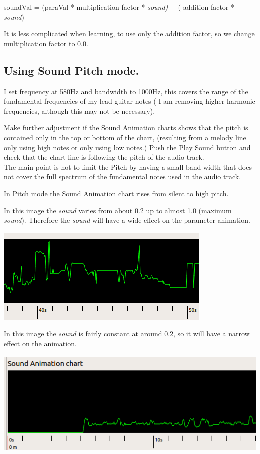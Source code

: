 soundVal = (paraVal * multiplication-factor * \emph{sound)} + (
addition-factor * \emph{sound})

It is less complicated when learning, to use only the addition factor,
so we change multiplication factor to 0.0.

\subsection{Using Sound Pitch mode.}\label{using-sound-pitch-mode.}

I set frequency at 580Hz and bandwidth to 1000Hz, this covers the range
of the fundamental frequencies of my lead guitar notes ( I am removing
higher harmonic frequencies, although this may not be necessary).

Make further adjustment if the Sound Animation charts shows that the
pitch is contained only in the top or bottom of the chart, (resulting
from a melody line only using high notes or only using low notes.) Push
the Play Sound button and check that the chart line is following the
pitch of the audio track.\\
The main point is not to limit the Pitch by having a small band width
that does not cover the full spectrum of the fundamental notes used in
the audio track.

In Pitch mode the Sound Animation chart rises from silent to high pitch.

In this image the \emph{sound} varies from about 0.2 up to almost 1.0
(maximum \emph{sound}). Therefore the \emph{sound} will have a wide
effect on the parameter animation.

\includegraphics[width=4.07283in,height=1.81260in]{img/sound/media/image5.png}

In this image the \emph{sound} is fairly constant at around 0.2, so it
will have a narrow effect on the animation.

\includegraphics[width=5.40630in,height=1.98976in]{img/sound/media/image6.png}

